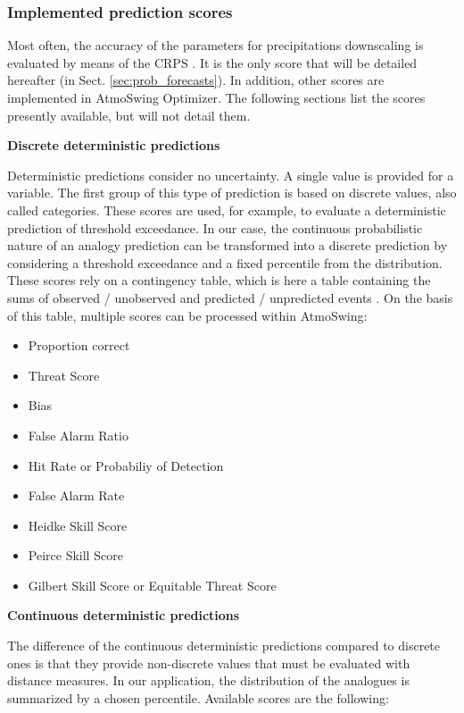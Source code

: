 \documentclass[review]{elsarticle}
\begin{document}
\subsubsection{Implemented prediction scores}
\label{sec:forecasts-scores}

Most often, the accuracy of the parameters for precipitations downscaling is evaluated by means of the CRPS \citep[Continuous Ranked Probability Score,][]{Brown1974, Matheson1976, Hersbach2000}. It is the only score that will be detailed hereafter (in Sect. \ref{sec:prob_forecasts}). In addition, other scores are implemented in AtmoSwing Optimizer. The following sections list the scores presently available, but will not detail them.


\textbf{Discrete deterministic predictions}

Deterministic predictions consider no uncertainty. A single value is provided for a variable. The first group of this type of prediction is based on discrete values, also called categories. These scores are used, for example, to evaluate a deterministic prediction of threshold exceedance. In our case, the continuous probabilistic nature of an analogy prediction can be transformed into a discrete prediction by considering a threshold exceedance and a fixed percentile from the distribution. These scores rely on a contingency table, which is here a table containing the sums of observed / unobserved and predicted / unpredicted events \citep{Wilks2006}. On the basis of this table, multiple scores can be processed within AtmoSwing:

\begin{itemize}
	\setlength\itemsep{-1mm}
	\item Proportion correct \citep{Finley1884}
	\item Threat Score \citep{Gilbert1884}
	\item Bias
	\item False Alarm Ratio
	\item Hit Rate or Probabiliy of Detection
	\item False Alarm Rate
	\item Heidke Skill Score \citep{Heidke1926}
	\item Peirce Skill Score \citep{Peirce1884}
	\item Gilbert Skill Score or Equitable Threat Score \citep{Gilbert1884}
\end{itemize}


\textbf{Continuous deterministic predictions}

The difference of the continuous deterministic predictions compared to discrete ones is that they provide non-discrete values that must be evaluated with distance measures. In our application, the distribution of the analogues is summarized by a chosen percentile. Available scores are the following:
\end{document}
